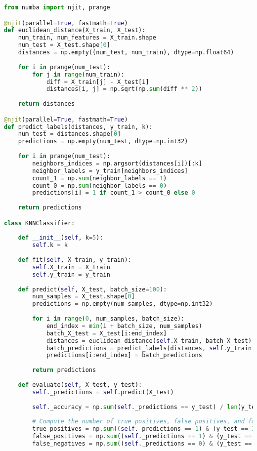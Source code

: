 \documentclass{article}
\begin{document}
\begin{lstlisting}[language=Python, caption=Model Implementation]
from numba import njit, prange

@njit(parallel=True, fastmath=True)
def euclidean_distance(X_train, X_test):
    num_train, num_features = X_train.shape
    num_test = X_test.shape[0]
    distances = np.empty((num_test, num_train), dtype=np.float64)
    
    for i in prange(num_test):
        for j in range(num_train):
            diff = X_train[j] - X_test[i]
            distances[i, j] = np.sqrt(np.sum(diff ** 2))
    
    return distances

@njit(parallel=True, fastmath=True)
def predict_labels(distances, y_train, k):
    num_test = distances.shape[0]
    predictions = np.empty(num_test, dtype=np.int32)
    
    for i in prange(num_test):
        neighbors_indices = np.argsort(distances[i])[:k]
        neighbor_labels = y_train[neighbors_indices]
        count_1 = np.sum(neighbor_labels == 1)
        count_0 = np.sum(neighbor_labels == 0)
        predictions[i] = 1 if count_1 > count_0 else 0
    
    return predictions

class KNNClassifier:
    
    def __init__(self, k=5):
        self.k = k
        
    def fit(self, X_train, y_train):
        self.X_train = X_train
        self.y_train = y_train
        
    def predict(self, X_test, batch_size=100):
        num_samples = X_test.shape[0]
        predictions = np.empty(num_samples, dtype=np.int32)
        
        for i in range(0, num_samples, batch_size):
            end_index = min(i + batch_size, num_samples)
            batch_X_test = X_test[i:end_index]
            distances = euclidean_distance(self.X_train, batch_X_test)
            batch_predictions = predict_labels(distances, self.y_train, self.k)
            predictions[i:end_index] = batch_predictions
        
        return predictions
    
    def evaluate(self, X_test, y_test):
        self._predictions = self.predict(X_test)
        
        self._accuracy = np.sum(self._predictions == y_test) / len(y_test)
        
        # Compute the number of true positives, false positives, and false negatives
        true_positives = np.sum((self._predictions == 1) & (y_test == 1))
        false_positives = np.sum((self._predictions == 1) & (y_test == 0))
        false_negatives = np.sum((self._predictions == 0) & (y_test == 1))
        

\end{lstlisting}
\end{document}
